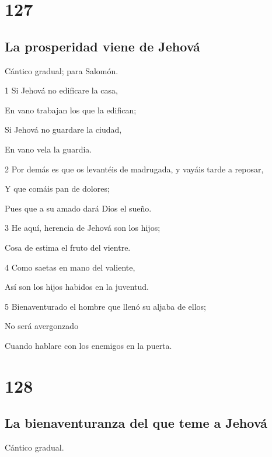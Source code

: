 \chapter{127}

\section*{La prosperidad viene de Jehová}

\par Cántico gradual; para Salomón.

\par 1 Si Jehová no edificare la casa,
\par En vano trabajan los que la edifican;
\par Si Jehová no guardare la ciudad,
\par En vano vela la guardia.
\par 2 Por demás es que os levantéis de madrugada, y vayáis tarde a reposar,
\par Y que comáis pan de dolores;
\par Pues que a su amado dará Dios el sueño.
\par 3 He aquí, herencia de Jehová son los hijos;
\par Cosa de estima el fruto del vientre.
\par 4 Como saetas en mano del valiente,
\par Así son los hijos habidos en la juventud.
\par 5 Bienaventurado el hombre que llenó su aljaba de ellos;
\par No será avergonzado
\par Cuando hablare con los enemigos en la puerta.

\chapter{128}

\section*{La bienaventuranza del que teme a Jehová}

\par Cántico gradual.

